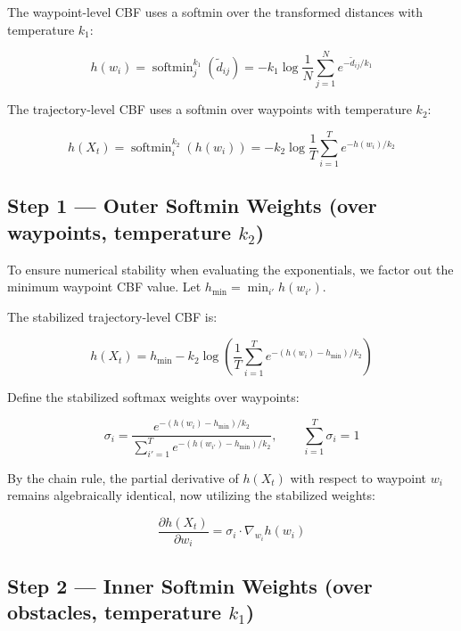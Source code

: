 \documentclass{article}
\newcommand{\softmin}{\operatorname{softmin}}
\begin{document}
The waypoint-level CBF uses a softmin over the transformed distances
with temperature $k_1$:

\begin{equation}
    h(w_i)
    = \softmin_j^{k_1}(\tilde{d}_{ij})
    = -k_1 \log \frac{1}{N}\sum_{j=1}^{N} e^{-\tilde{d}_{ij}/k_1}
\end{equation}

The trajectory-level CBF uses a softmin over waypoints with temperature $k_2$:

\begin{equation}
    h(X_t)
    = \softmin_i^{k_2}(h(w_i))
    = -k_2 \log \frac{1}{T}\sum_{i=1}^{T} e^{-h(w_i)/k_2}
\end{equation}

\subsection*{Step 1 --- Outer Softmin Weights (over waypoints, temperature $k_2$)}

To ensure numerical stability when evaluating the exponentials, we factor out the minimum waypoint CBF value. Let $h_{\min} = \min_{i'} h(w_{i'})$.

The stabilized trajectory-level CBF is:

\begin{equation}
    h(X_t)
    = h_{\min} - k_2 \log \left( \frac{1}{T}\sum_{i=1}^{T} e^{-(h(w_i) - h_{\min})/k_2} \right)
\end{equation}

Define the stabilized softmax weights over waypoints:

\begin{equation}
    \sigma_i
    = \frac{e^{-(h(w_i) - h_{\min})/k_2}}{\displaystyle\sum_{i'=1}^{T} e^{-(h(w_{i'}) - h_{\min})/k_2}},
    \qquad \sum_{i=1}^{T} \sigma_i = 1
\end{equation}

By the chain rule, the partial derivative of $h(X_t)$ with respect to
waypoint $w_i$ remains algebraically identical, now utilizing the stabilized weights:

\begin{equation}
    \frac{\partial h(X_t)}{\partial w_i}
    = \sigma_i \cdot \nabla_{w_i} h(w_i)
\end{equation}

\subsection*{Step 2 --- Inner Softmin Weights (over obstacles, temperature $k_1$)}
\end{document}
